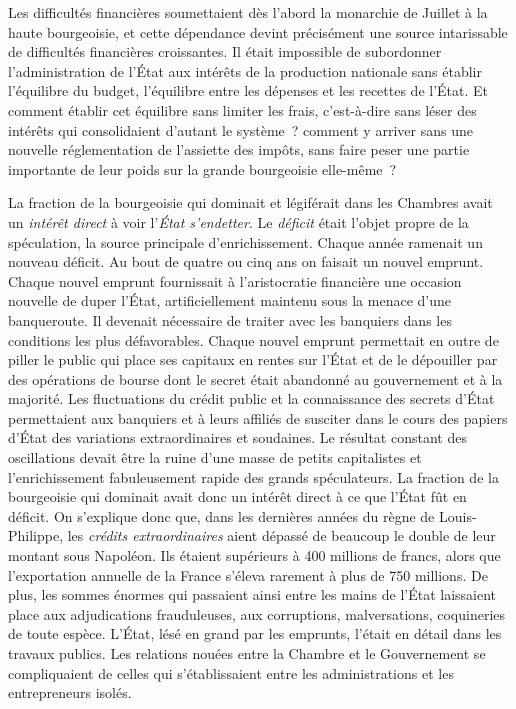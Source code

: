 \documentclass[twoside]{book} %
\begin{document}
Les difficultés financières soumettaient dès l’abord la monarchie de Juillet à la haute bourgeoisie, et cette dépendance devint précisément une source intarissable de difficultés financières croissantes. Il était impossible de subordonner l’administration de l’État aux intérêts de la production nationale sans établir l’équilibre du budget, l’équilibre entre les dépenses et les recettes de l’État. Et comment établir cet équilibre sans limiter les frais, c’est-à-dire sans léser des intérêts qui consolidaient d’autant le système ? comment y arriver sans une nouvelle réglementation de l’assiette des impôts, sans faire peser une partie importante de leur poids sur la grande bourgeoisie elle-même ?\par
La fraction de la bourgeoisie qui dominait et légiférait dans les Chambres avait un \emph{intérêt direct} à voir l’\emph{État s’endetter}. Le \emph{déficit} était l’objet propre de la spéculation, la source principale d’enrichissement. Chaque année ramenait un nouveau déficit. Au bout de quatre ou cinq ans on faisait un nouvel emprunt. Chaque nouvel emprunt fournissait à l’aristocratie financière une occasion nouvelle de duper l’État, artificiellement maintenu sous la menace d’une banqueroute. Il devenait nécessaire de traiter avec les banquiers dans les conditions les plus défavorables. Chaque nouvel emprunt permettait en outre de piller le public qui place ses capitaux en rentes sur l’État et de le dépouiller par des opérations de bourse dont le secret était abandonné au gouvernement et à la majorité. Les fluctuations du crédit public et la connaissance des secrets d’État permettaient aux banquiers et à leurs affiliés de susciter dans le cours des papiers d’État des variations extraordinaires et soudaines. Le résultat constant des oscillations devait être la ruine d’une masse de petits capitalistes et l’enrichissement fabuleusement rapide des grands spéculateurs. La fraction de la bourgeoisie qui dominait avait donc un intérêt direct à ce que l’État fût en déficit. On s’explique donc que, dans les dernières années du règne de Louis-Philippe, les \emph{crédits extraordinaires} aient dépassé de beaucoup le double de leur montant sous Napoléon. Ils étaient supérieurs à 400 millions de francs, alors que l’exportation annuelle de la France s’éleva rarement à plus de 750 millions. De plus, les sommes énormes qui passaient ainsi entre les mains de l’État laissaient place aux adjudications frauduleuses, aux corruptions, malversations, coquineries de toute espèce. L’État, lésé en grand par les emprunts, l’était en détail dans les travaux publics. Les relations nouées entre la Chambre et le Gouvernement se compliquaient de celles qui s’établissaient entre les administrations et les entrepreneurs isolés.\par
\end{document}
